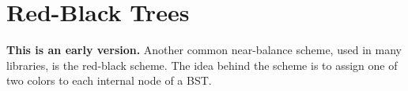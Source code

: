 \begin{comment}
There are two problems with expectations, at least on their own.
Firstly, they tell us very little if anything about the variance.  And
secondly, as mentioned in an earlier lecture, the expectation of a
maximum can be much higher than the maximum of expectations.  The
first has implications in real time systems where we need to get
things done in time, and the second in getting efficient parallel
algorithms (e.g., span is the max span of the two parallel
calls).  Proving these high probability bounds is beyond the scope of
this course.
\end{comment}


\begin{comment}
\section*{Summary}

Earlier we showed that randomized quicksort has worst-case expected
$O(n \log n)$ work, and this expectation was independent of the input.
That is, there is no bad input that would cause the work to be worse
than $O(n \log n)$ all the time.  It is possible, however, (with extremely low
probability) we could be unlucky, and the random chosen pivots could
result in quicksort taking $O(n^2)$ work.

It turns out the same analysis shows that a deterministic quicksort will
on average have $O(n \log n)$ work.  Just shuffle the input randomly,
and run the algorithm.  It behaves the same way as randomized
quicksort on that shuffled input.  Unfortunately, on some inputs
(e.g., almost sorted) the deterministic quicksort is slow, $O(n^2)$,
every time on that input.

Treaps take advantage of the same randomization idea.  But a binary
search tree is a dynamic data structure, and it cannot change the order in
which operations are applied to it. So instead of randomizing the input
order, it adds randomization to the data structure itself.
\end{comment}

\section{Red-Black Trees}

\textbf{This is an early version.}
Another common near-balance scheme, used in many libraries, is the
red-black scheme.  The idea behind the scheme is to assign one of two
colors to each internal node of a BST.

